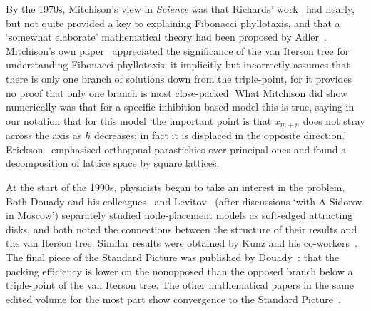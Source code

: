 By the 1970s, Mitchison's view in \textit{Science} was that Richards' work~\autocite{richardsGeometryPhyllotaxisIts1948} had nearly, but not quite provided a key to explaining Fibonacci phyllotaxis, and that a `somewhat elaborate' mathematical theory had been proposed by Adler~\autocite{adlerModelContactPressure1974}.   Mitchison's own paper~\cite{mitchisonPhyllotaxisFibonacciSeries1977} appreciated the significance of the van Iterson tree for understanding Fibonacci phyllotaxis; it implicitly but incorrectly assumes that there is only one branch of solutions down from the triple-point, for it provides no proof that only one branch is most close-packed. What Mitchison did show numerically was that for a specific inhibition based model this is true, saying in our notation that for this model `the important point is that $x_{m+n}$ does not stray across the axis as $h$ decreases; in fact it is displaced in the opposite direction.' 
Erickson~\cite{ericksonGeometryPhyllotaxis1983} emphasised orthogonal parastichies over principal ones and found a decomposition of lattice space by square lattices. 

At the start of the 1990s, physicists began to take an interest in the problem. Both Douady and his colleagues~\autocite{douadyPhyllotaxisPhysicalSelforganized1992} and Levitov~\autocite{levitovFibonacciNumbersBotany1991} (after discussions `with A Sidorov in Moscow') separately studied node-placement models as soft-edged attracting disks, and both noted the connections between the structure of their results and the van Iterson tree. Similar results were obtained by Kunz and his co-workers~\autocite{kunzPhyllotaxisPropertiesSpiral1992}. The final piece of the Standard Picture was published by Douady~\cite{douadySelectionPhyllotacticPatterns1998}: that the packing efficiency is lower on the nonopposed than the opposed branch below a triple-point of the van Iterson tree. The other mathematical papers in the same edited volume for the most part show convergence to the Standard Picture~\autocite{jeanSymmetryPlants1998}. 


